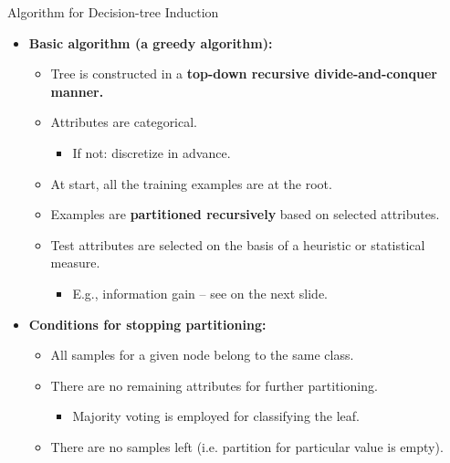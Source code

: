 \begin{frame}{Algorithm for Decision-tree Induction}
	\begin{itemize}
		\item \textbf{Basic algorithm (a greedy algorithm):}
		      \begin{itemize}
			      \item Tree is constructed in a \textbf{\color{airforceblue}top-down recursive divide-and-conquer manner.}
			      \item Attributes are categorical.
			            \begin{itemize}
				            \item If not: discretize in advance.
			            \end{itemize}
			      \item At start, all the training examples are at the root.
			      \item Examples are \textbf{\color{airforceblue}partitioned recursively} based on selected attributes.
			      \item Test attributes are selected on the basis of a heuristic or statistical measure.
			            \begin{itemize}
				            \item E.g., information gain -- see on the next slide.
			            \end{itemize}
		      \end{itemize}
		\item \textbf{Conditions for stopping partitioning:}
		      \begin{itemize}
			      \item All samples for a given node belong to the same class.
			      \item There are no remaining attributes for further partitioning.
			            \begin{itemize}
				            \item Majority voting is employed for classifying the leaf.
			            \end{itemize}
			      \item There are no samples left (i.e. partition for particular value is empty).
		      \end{itemize}
	\end{itemize}
\end{frame}

